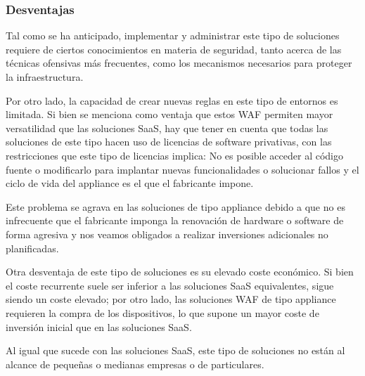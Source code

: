 \subsubsection{Desventajas}
\par Tal como se ha anticipado, implementar y administrar este tipo de soluciones requiere de ciertos conocimientos en materia de seguridad,
tanto acerca de las técnicas ofensivas más frecuentes, como los mecanismos necesarios para proteger la infraestructura.
\par Por otro lado, la capacidad de crear nuevas reglas en este tipo de entornos es limitada. Si bien se menciona como ventaja que estos WAF
permiten mayor versatilidad que las soluciones SaaS, hay que tener en cuenta que todas las soluciones de este tipo hacen uso de licencias de
software privativas, con las restricciones que este tipo de licencias implica:  No es posible acceder al código fuente o modificarlo para
implantar nuevas funcionalidades o solucionar fallos y el ciclo de vida del appliance es el que el fabricante impone.
\par Este problema se agrava en las soluciones de tipo appliance debido a que no es infrecuente que el fabricante imponga la renovación de
hardware o software de forma agresiva y nos veamos obligados a realizar inversiones adicionales no planificadas.

\par Otra desventaja de este tipo de soluciones es su elevado coste económico. Si bien el coste recurrente suele ser inferior a las soluciones
SaaS equivalentes, sigue siendo un coste elevado; por otro lado, las soluciones WAF de tipo appliance requieren la compra de los dispositivos,
lo que supone un mayor coste de inversión inicial que en las soluciones SaaS.
\par Al igual que sucede con las soluciones SaaS, este tipo de soluciones no están al alcance de pequeñas o medianas empresas o de
particulares.


